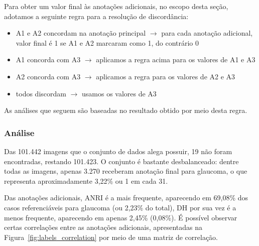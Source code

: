 \documentclass[12pt]{article}
\begin{document}
Para obter um valor final às anotações adicionais, no escopo desta seção, adotamos a seguinte regra para a resolução de discordância:

\begin{itemize}[noitemsep,topsep=0pt]
    \item A1 e A2 concordam na anotação principal $\rightarrow$ para cada anotação adicional, valor final é 1 se A1 e A2 marcaram como 1, do contrário 0
    \item A1 concorda com A3 $\rightarrow$ aplicamos a regra acima para os valores de A1 e A3
    \item A2 concorda com A3 $\rightarrow$ aplicamos a regra para os valores de A2 e A3
    \item todos discordam $\rightarrow$ usamos os valores de A3
\end{itemize}


As análises que seguem são baseadas no resultado obtido por meio desta regra.

\subsubsection{Análise}
\label{sec:dataset:analysis}
Das 101.442 imagens que o conjunto de dados alega possuir, 19 não foram encontradas, restando 101.423. O conjunto é bastante desbalanceado: dentre todas as imagens, apenas 3.270 receberam anotação final para glaucoma, o que representa aproximadamente 3,22\% ou 1 em cada 31.

Das anotações adicionais, ANRI é a mais frequente, aparecendo em 69,08\% dos casos referenciáveis para glaucoma (ou 2,23\% do total), DH por sua vez é a menos frequente, aparecendo em apenas 2,45\% (0,08\%). 
É possível observar certas correlações entre as anotações adicionais, apresentadas na Figura~\ref{fig:labels_correlation} por meio de uma matriz de correlação.

\end{document}
